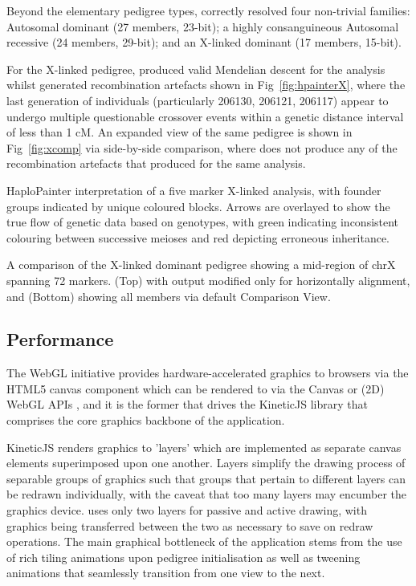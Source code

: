 Beyond the elementary pedigree types, \haplo correctly resolved four non-trivial families: Autosomal dominant (27 members, 23-bit); a highly consanguineous Autosomal recessive (24 members, 29-bit); and an X-linked dominant (17 members, 15-bit).

For the X-linked pedigree, \haplo produced valid Mendelian descent for the analysis whilst \hpainter generated recombination artefacts shown in Fig~\ref{fig:hpainterX}, where the last generation of individuals (particularly 206130, 206121, 206117) appear to undergo multiple questionable crossover events within a genetic distance interval of less than 1 cM. An expanded view of the same pedigree is shown in Fig~\ref{fig:xcomp} via side-by-side comparison, where \haplo does not produce any of the recombination artefacts that \hpainter produced for the same analysis.

	{HaploPainter interpretation of a five marker X-linked analysis, with founder groups indicated by unique coloured blocks. Arrows are overlayed to show the true flow of genetic data based on genotypes, with green indicating inconsistent colouring between successive meioses and red depicting erroneous inheritance.
}


	{A comparison of the X-linked dominant pedigree showing a mid-region of chrX spanning 72 markers.
(Top) \hpainter with output modified only for horizontally alignment, and (Bottom) \haplo showing all members via default Comparison View.}


\subsection{Performance}

The WebGL initiative provides hardware-accelerated graphics to browsers via the HTML5 canvas component which can be rendered to via the Canvas or (2D) WebGL APIs \citep{whatwgliving}, and it is the former that drives the KineticJS library that comprises the core graphics backbone of the application.

KineticJS renders graphics to 'layers' which are implemented as separate canvas elements superimposed upon one another. Layers simplify the drawing process of separable groups of graphics such that groups that pertain to different layers can be redrawn individually, with the caveat that too many layers may encumber the graphics device. \haplo uses only two layers for passive and active drawing, with graphics being transferred between the two as necessary to save on redraw operations. The main graphical bottleneck of the application stems from the use of rich tiling animations upon pedigree initialisation as well as tweening animations that seamlessly transition from one view to the next.

